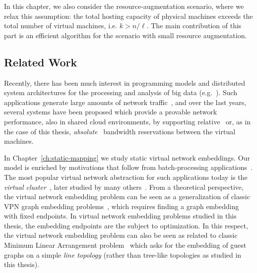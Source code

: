 In this chapter, we also consider the resource-augmentation scenario, where we relax this assumption: the total hosting capacity of physical machines exceeds the total number of virtual machines, i.e. $k > n/\ell$.
The main contribution of this part is an efficient algorithm for the scenario with small resource augmentation.



\subsection{Related Work}


Recently, there has been much interest in programming models and distributed
system architectures for the processing and analysis of big data (e.g.~\cite{nodb,mapreduce,shark}).
Such applications
generate large amounts of network traffic~\cite{orchestra,talk-about,amazonbw},
and over the last years, several systems have been proposed which provide
a provable network performance, also in shared cloud environments, by supporting
relative~\cite{faircloud,elasticswitch,seawall}
or, as in the case of this thesis, \emph{absolute}~\cite{oktopus,secondnet,drl,gatekeeper,proteus} bandwidth reservations
between the virtual machines.

In Chapter~\ref{ch:static-mapping} we study static virtual network embeddings.
Our model is enriched by motivations that follow from batch-processing applications~\cite{mapreduce}.
The most popular virtual network abstraction for such applications today is the \emph{virtual cluster}~\cite{oktopus}, later studied by many others~\cite{talk-about,infocom16,ccr15emb,proteus}.
From a theoretical perspective, the virtual network embedding problem can be seen as a generalization
of classic VPN graph embedding problems~\cite{Goyal2008,gupta2001provisioning}, which requires finding a graph embedding with fixed endpoints.
In virtual network embedding problems studied in this thesis, the embedding endpoints are the subject to optimization.
In this respect, the virtual network embedding problem can also be seen as related to
classic Minimum Linear Arrangement problem~\cite{mla,mla-survey} which asks for the
embedding of guest graphs on a simple \emph{line topology} (rather than tree-like topologies as
studied in this thesis).


